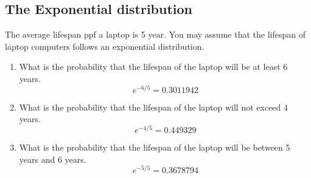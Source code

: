 \documentclass[12pt, a4paper]{report}
\theoremstyle{definition}
\theoremstyle{remark}
\begin{document}
\subsection{The Exponential distribution}
The average lifespan ppf a laptop is 5 year. You may assume that the lifespan of laptop computers follows an exponential distribution.

\begin{enumerate}
	\item What is the probability that the lifespan of the laptop will be at least 6 years.
	\[e^{-6/5} = 0.3011942\]
	\item What is the probability that the lifespan of the laptop will not exceed 4 years.
	\[e^{-4/5} = 0.449329\]
	\item What is the probability that the lifespan of the laptop will be between 5 years and 6 years.
	\[e^{-5/5} = 0.3678794\]
\end{enumerate}
	
	
\end{document}
